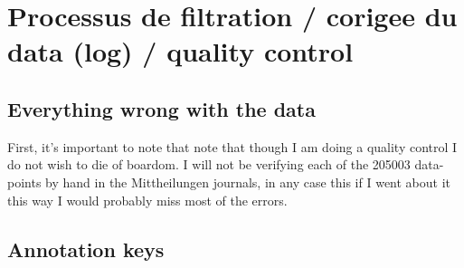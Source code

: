 \documentclass[12pt]{article}
\begin{document}
\section{Processus de filtration / corigee du data (log) / quality control}

\subsection{Everything wrong with the data}

First, it's important to note that note that though I am doing a quality control I do not wish to die of boardom. I will not be verifying each of the 205003 data-points by hand in the Mittheilungen journals, in any case this if I went about it this way I would probably miss most of the errors.

\subsection{Annotation keys}
\end{document}
